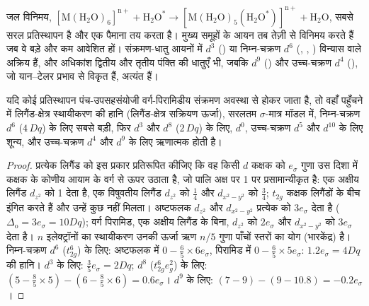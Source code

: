 जल विनिमय, $\mathrm{[M(H_2O)_6]^{n+} + H_2O^{\ast} \to [M(H_2O)_5(H_2O^{\ast})]^{n+} + H_2O}$, सबसे सरल
प्रतिस्थापन है और एक पैमाना तय करता है। मुख्य समूहों के आयन तब तेज़ी से विनिमय करते हैं जब वे
बड़े और कम आवेशित हों। संक्रमण-धातु आयनों में $d^3$
() या निम्न-चक्रण $d^6$ (, , ) विन्यास वाले अक्रिय हैं, और
अधिकांश द्वितीय और तृतीय पंक्ति की धातुएँ भी, जबकि $d^9$ () और उच्च-चक्रण $d^4$ (),
जो यान--टेलर प्रभाव से विकृत हैं, अत्यंत  हैं।

\begin{proposition}[लिगैंड-क्षेत्र सक्रियण ऊर्जा]\label{prop:b3:complex-mechanisms:lfae}
यदि कोई प्रतिस्थापन पंच-उपसहसंयोजी वर्ग-पिरामिडीय संक्रमण
अवस्था से होकर जाता है, तो वहाँ पहुँचने में लिगैंड-क्षेत्र स्थायीकरण की हानि (लिगैंड-क्षेत्र
सक्रियण ऊर्जा), सरलतम $\sigma$-मात्र मॉडल में, निम्न-चक्रण $d^6$
($4\,Dq$) के लिए सबसे बड़ी, फिर $d^3$ और $d^8$ ($2\,Dq$) के लिए, $d^0$, उच्च-चक्रण $d^5$ और $d^{10}$ के लिए शून्य, और
उच्च-चक्रण $d^4$ और $d^9$ के लिए ऋणात्मक होती है।
\end{proposition}

\begin{proof}
प्रत्येक लिगैंड को इस प्रकार प्रतिरूपित कीजिए कि वह किसी $d$ कक्षक को $e_\sigma$ गुणा उस दिशा में कक्षक के
कोणीय आयाम के वर्ग से ऊपर उठाता है, जो पालि अक्ष पर 1 पर प्रसामान्यीकृत है: एक अक्षीय
लिगैंड $d_{z^2}$ को 1 देता है, एक विषुवतीय लिगैंड $d_{z^2}$ को $\frac14$ और $d_{x^2-y^2}$ को $\frac34$; $t_{2g}$ कक्षक
लिगैंडों के बीच इंगित करते हैं और उन्हें कुछ नहीं मिलता। अष्टफलक $d_{z^2}$ और $d_{x^2-y^2}$ प्रत्येक को $3e_\sigma$ देता है
($\Delta_{\mathrm o} = 3e_\sigma = 10Dq$); वर्ग पिरामिड, एक अक्षीय लिगैंड के बिना, $d_{z^2}$ को $2e_\sigma$ और
$d_{x^2-y^2}$ को $3e_\sigma$ देता है। $n$ इलेक्ट्रॉनों का स्थायीकरण उनकी ऊर्जा ऋण $n/5$ गुणा
पाँचों स्तरों का योग (भारकेंद्र) है। निम्न-चक्रण $d^6$ ($t_{2g}^6$) के लिए: अष्टफलक में $0 - \frac65 \times 6e_\sigma$,
पिरामिड में $0 - \frac65 \times 5e_\sigma$: $1.2e_\sigma = 4Dq$ की हानि। $d^3$ के लिए: $\frac35e_\sigma =
2Dq$; $d^8$ ($t_{2g}^6e_g^2$) के लिए: $(5 - \frac85 \times 5) - (6 - \frac85 \times 6) = 0.6e_\sigma$। $d^9$ के लिए: $(7 - 9) - (9 -
10.8) = -0.2e_\sigma$।
\end{proof}

